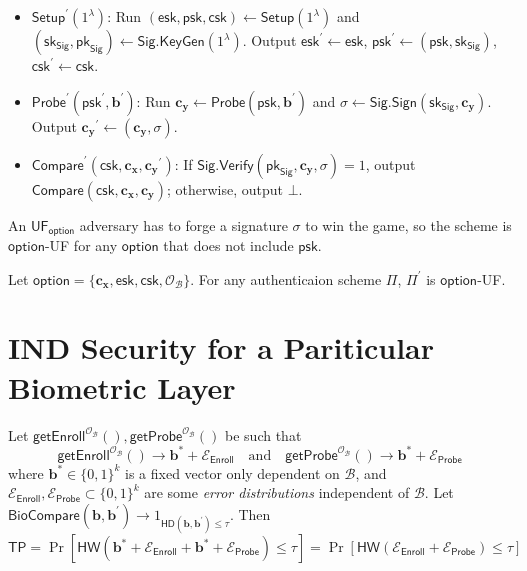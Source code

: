 \begin{itemize}

	\item $\textsf{Setup}^\prime (1^\lambda)$: Run $(\textsf{esk}, \textsf{psk}, \textsf{csk}) \gets \textsf{Setup}(1^\lambda)$ and $(\textsf{sk}_{\textsf{Sig}}, \textsf{pk}_{\textsf{Sig}}) \gets \textsf{Sig.KeyGen}(1^\lambda)$. Output $\textsf{esk}^\prime \gets \textsf{esk}$, $\textsf{psk}^\prime \gets (\textsf{psk}, \textsf{sk}_{\textsf{Sig}})$, $\textsf{csk}^\prime \gets \textsf{csk}$.

	\item $\textsf{Probe}^\prime (\textsf{psk}^\prime, \mathbf{b}^\prime)$: Run $\mathbf{c_y} \gets \textsf{Probe}(\textsf{psk}, \mathbf{b}^\prime)$ and $\sigma \gets \textsf{Sig.Sign}(\textsf{sk}_{\textsf{Sig}}, \mathbf{c_y})$. Output $\mathbf{c_y}^\prime \gets (\mathbf{c_y}, \sigma)$.

	\item $\textsf{Compare}^\prime (\textsf{csk}, \mathbf{c_x}, \mathbf{c_y}^\prime)$: If $\textsf{Sig.Verify}(\textsf{pk}_{\textsf{Sig}}, \mathbf{c_y}, \sigma) = 1$, output $\textsf{Compare}(\textsf{csk}, \mathbf{c_x}, \mathbf{c_y})$; otherwise, output $\bot$.

\end{itemize}

An $\textsf{UF}_\textsf{option}$ adversary has to forge a signature $\sigma$ to win the game, so the scheme is $\textsf{option}$-UF for any $\textsf{option}$ that does not include $\textsf{psk}$. 

\begin{theorem}
\label{thm:sEUF-CMA-esk-csk}
	Let $\textsf{option} = \{ \mathbf{c_x}, \textsf{esk}, \textsf{csk}, \mathcal{O}_\mathcal{B} \}$. For any authenticaion scheme $\Pi$, $\Pi^\prime$ is $\textsf{option}$-UF. 
\end{theorem}


\section{IND Security for a Pariticular Biometric Layer}

Let $\textsf{getEnroll}^{\mathcal{O}_{\mathcal{B}}}(), \textsf{getProbe}^{\mathcal{O}_{\mathcal{B}}}()$ be such that
\[
	\textsf{getEnroll}^{\mathcal{O}_{\mathcal{B}}}() \to \mathbf{b}^* + \mathcal{E}_{\textsf{Enroll}}  \quad \text{and} \quad \textsf{getProbe}^{\mathcal{O}_{\mathcal{B}}}() \to \mathbf{b}^* + \mathcal{E}_{\textsf{Probe}}
\]
where $\mathbf{b}^* \in \{0, 1\}^k$ is a fixed vector only dependent on $\mathcal{B}$, and $\mathcal{E}_{\textsf{Enroll}}, \mathcal{E}_{\textsf{Probe}} \subset \{0, 1\}^k$ are some \emph{error distributions} independent of $\mathcal{B}$. Let $\textsf{BioCompare}(\mathbf{b}, \mathbf{b}^\prime) \to 1_{\textsf{HD}(\mathbf{b}, \mathbf{b}^\prime) \leq \tau}$. Then
\[
	\textsf{TP} = \Pr[ \textsf{HW}(\mathbf{b}^* + \mathcal{E}_{\textsf{Enroll}} + \mathbf{b}^* + \mathcal{E}_{\textsf{Probe}}) \leq \tau ] = \Pr[ \textsf{HW}(\mathcal{E}_{\textsf{Enroll}} + \mathcal{E}_{\textsf{Probe}}) \leq \tau ]
\]

